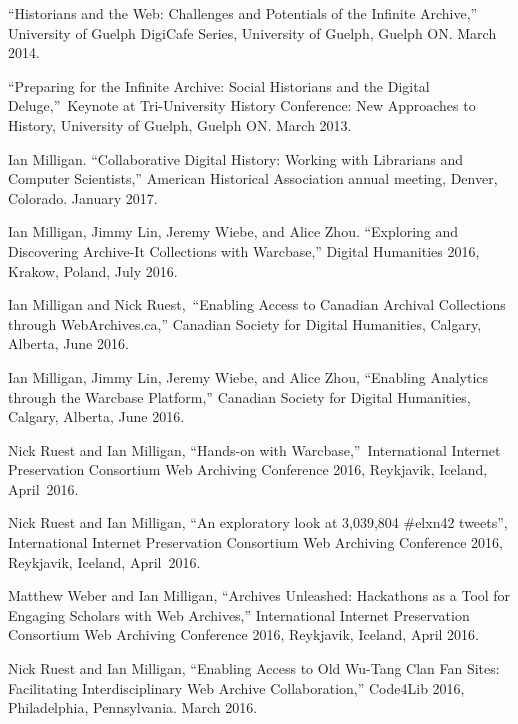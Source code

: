 \documentclass[11pt,article,oneside]{memoir}
\begin{document}
\ind ``Historians and the Web: Challenges and Potentials of the Infinite Archive,'' University of Guelph DigiCafe Series, University of Guelph, Guelph ON. March 2014.

\ind ``Preparing for the Infinite Archive: Social Historians and the Digital Deluge,'' Keynote at Tri-University History Conference: New Approaches to History, University of Guelph, Guelph ON. March 2013.


\bigskip


\medskip

\ind Ian Milligan. ``Collaborative Digital History: Working with Librarians and Computer Scientists,'' American Historical Association annual meeting, Denver, Colorado. January 2017.

\ind Ian Milligan, Jimmy Lin, Jeremy Wiebe, and Alice Zhou. ``Exploring and Discovering Archive-It Collections with Warcbase,'' Digital Humanities 2016, Krakow, Poland, July 2016.

\ind Ian Milligan and Nick Ruest, ``Enabling Access to Canadian Archival Collections through WebArchives.ca,'' Canadian Society for Digital Humanities, Calgary, Alberta, June 2016. 

\ind Ian Milligan, Jimmy Lin, Jeremy Wiebe, and Alice Zhou, ``Enabling Analytics through the Warcbase Platform,'' Canadian Society for Digital Humanities, Calgary, Alberta, June 2016.

\ind Nick Ruest and Ian Milligan, ``Hands-on with Warcbase,'' International Internet Preservation Consortium Web Archiving Conference 2016, Reykjavik, Iceland, April 2016.

\ind Nick Ruest and Ian Milligan, ``An exploratory look at 3,039,804 \#elxn42 tweets'', International Internet Preservation Consortium Web Archiving Conference 2016, Reykjavik, Iceland, April 2016.

\ind Matthew Weber and Ian Milligan, ``Archives Unleashed: Hackathons as a Tool for Engaging Scholars with Web Archives,'' International Internet Preservation Consortium Web Archiving Conference 2016, Reykjavik, Iceland, April 2016.

\ind Nick Ruest and Ian Milligan, ``Enabling Access to Old Wu-Tang Clan Fan Sites: Facilitating Interdisciplinary Web Archive Collaboration,'' Code4Lib 2016, Philadelphia, Pennsylvania. March 2016. 
\end{document}
